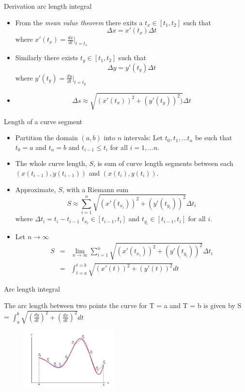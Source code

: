 \documentclass{beamer}
\begin{document}
\begin{frame}{Derivation arc length integral}	
	\begin{itemize}
		\item From the \emph{mean value theorem} there exits a $t_x \in [t_1, t_2]$ such that	
		\[
			\Delta x = x'(t_x) \Delta t
		\]
		where $x'(t_x) = \frac{dx}{dt}\big|_{t=t_x}$
		\item Similarly there exists $t_y \in [t_1, t_2]$ such that 
		\[
			\Delta y = y'(t_y) \Delta t
		\]
		where $y'(t_y) = \frac{dy}{dt}\big|_{t=t_y}$ 
		\item 
		\[
			\Delta s \approx \sqrt{\left(x'(t_x)\right)^2 + \left(y'(t_y)\right)^2)} \Delta t
		\]
	\end{itemize}
\end{frame}

\begin{frame}{Length of a curve segment}
	
	\begin{itemize}
		\item Partition the domain $(a,b)$ into $n$ intervals: Let $t_0, t_1, \dots t_n$ be such that $t_0=a$ and $t_n=b$ and $t_{i-1} \le t_{i}$ for all $i=1, \dots n$. 
		\item The whole curve length, $S$, is sum of curve length segments between each $(x(t_{i-1}), y(t_{i-1}))$ and $(x(t_i), y(t_i))$.  
		\item Approximate, $S$, with a Riemann sum 
		\[
			S \approx \sum\limits^{n}_{i=1} \sqrt{\left(x'(t_{x_i})\right)^2 + \left(y'(t_{y_i})\right)^2} \Delta t_i 
		\] 
		where $\Delta t_i = t_i-t_{i-1}$
		$t_{x_i} \in [t_{i-1}, t_{i}]$ and $t_{y_i} \in [t_{i-1}, t_{i}]$ for all $i$.
		\item Let $n \to \infty$ 
		\begin{eqnarray*}
			S &=& \lim_{n \to \infty} \sum\limits^{n}_{i=1} \sqrt{\left(x'(t_{x_i})\right)^2 + \left(y'(t_{y_i})\right)^2} \Delta t_i \\
			& = & \int_{t=a}^{t=b} \sqrt{(x'(t))^2 + (y'(t))^2 } dt
		\end{eqnarray*}
	\end{itemize}
\end{frame}

\begin{frame}{Arc length integral}
	\begin{theorem}
		The arc length between two points the curve for T = a and T = b is given by
		S = $\int_{a}^{b} \sqrt{\left(\frac{dy}{dt}\right)^2+\left(\frac{dx}{dt}\right)^2}dt$
	\end{theorem}
	\begin{figure}
		\centering
		\includegraphics[width=50mm, scale=0.4]{Arc length Integral.png}
	\end{figure}
\end{frame}
\end{document}
